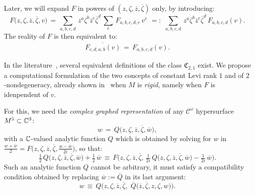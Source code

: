 \documentclass[12pt,twoside,leqno,openany]{amsart}
\begin{document}
Later, we will expand $F$ in powers of $(z, \zeta, \overline{z},
\overline{\zeta})$ only, by introducing:
\[
F\big(z,\zeta,\overline{z},\overline{\zeta},v\big)
\,=\,
\sum_{a,b,c,d}\,
z^a\zeta^b\overline{z}^c\overline{\zeta}^d\,
\sum_e\,
F_{a,b,c,d,e}\,v^e
\,\,=:\,\,
\sum_{a,b,c,d}\,
z^a\zeta^b\overline{z}^c\overline{\zeta}^d\,
F_{a,b,c,d}(v).
\]
The reality of $F$ is then equivalent to:
\leqnomode{}
\begin{align}
\label{reality-F-v}
\overline{F_{c,d,a,b}(v)}
\,=\,
F_{a,b,c,d}(v).
\end{align}

In the literature~{\cite{
Freeman-1977,
Gaussier-Merker-2003,
Merker-2008,
Fels-Kaup-2008,
Merker-Pocchiola-Sabzevari-2013-5-CR-II,
Isaev-Zaitsev-2013,
Medori-Spiro-2014,
Medori-Spiro-2015,
Merker-Nurowski-2020,
Foo-Merker-2019,
Foo-Merker-Ta-2019}}, 
several equivalent definitions of the class $\mathfrak{C}_{2,1}$
exist. We propose a computational formulation
of the two concepts of
constant Levi rank $1$ and of $2$-nondegeneracy,
already shown in~{\cite{Chen-Foo-Merker-Ta-2019}}
when $M$ is {\sl rigid}, namely when $F$ is idenpendent of $v$.

For this, we need the {\sl complex graphed representation}
of any $\mathcal{C}^\omega$ hypersurface $M^5 \subset \mathbb{C}^3$:
\[
w
\,=\,
Q\big(z,\zeta,\overline{z},\overline{\zeta},\overline{w}\big),
\]
with a $\mathbb{C}$-valued 
analytic function $Q$ which is obtained by solving for $w$ in
$\frac{w+\overline{w}}{2} = F \big(z, \zeta, \overline{z},
\overline{\zeta}, \frac{w-\overline{w}}{2i} \big)$, so that:
\[
\tfrac{1}{2}\,
Q\big(z,\zeta,\overline{z},\overline{\zeta},\overline{w}\big)
+
\tfrac{1}{2}\,
\overline{w}
\,\equiv\,
F
\Big(
z,\zeta,\overline{z},\overline{\zeta},\,
\tfrac{1}{2i}\,
Q\big(z,\zeta,\overline{z},\overline{\zeta},\overline{w}\big)
-
\tfrac{1}{2i}\,\overline{w}
\Big).
\]
Such an analytic function $Q$ cannot be arbitrary, it must
satisfy a compatibility condition obtained by replacing
$\overline{w} := \overline{Q}$ in its last argument:
\[
w
\,\equiv\,
Q\Big(
z,\zeta,\overline{z},\overline{\zeta},\,\,
\overline{Q}\big(\overline{z},\overline{\zeta},z,\zeta,w\big)
\Big).
\]

\label{two-invariant-determinants}
\end{document}
